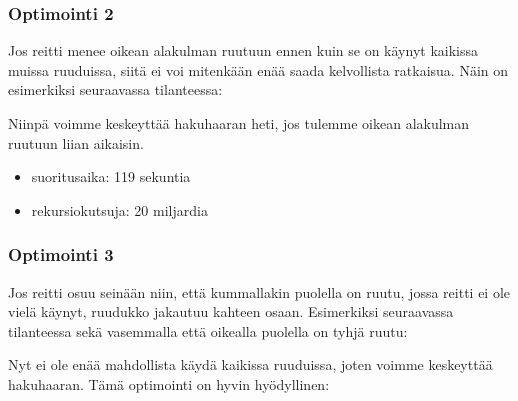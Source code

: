 \subsubsection{Optimointi 2}

Jos reitti menee oikean alakulman ruutuun ennen kuin
se on käynyt kaikissa muissa ruuduissa,
siitä ei voi mitenkään enää saada kelvollista ratkaisua.
Näin on esimerkiksi seuraavassa tilanteessa:

\begin{center}
\end{center}
Niinpä voimme keskeyttää hakuhaaran heti,
jos tulemme oikean alakulman ruutuun liian aikaisin.
\begin{itemize}
\item
suoritusaika: 119 sekuntia
\item
rekursiokutsuja: 20 miljardia
\end{itemize}

\subsubsection{Optimointi 3}

Jos reitti osuu seinään niin, että kummallakin puolella
on ruutu, jossa reitti ei ole vielä käynyt,
ruudukko jakautuu kahteen osaan.
Esimerkiksi seuraavassa tilanteessa
sekä vasemmalla että
oikealla puolella on tyhjä ruutu:

\begin{center}
\end{center}
Nyt ei ole enää mahdollista käydä kaikissa ruuduissa,
joten voimme keskeyttää hakuhaaran.
Tämä optimointi on hyvin hyödyllinen:

